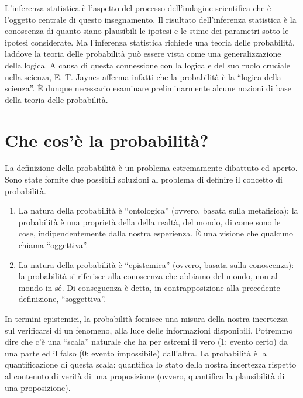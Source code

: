 \documentclass[
  11pt,
]{krantz}
\theoremstyle{definition}
\theoremstyle{definition}
\theoremstyle{definition}
\theoremstyle{definition}
\theoremstyle{remark}
\begin{document}
L'inferenza statistica è l'aspetto del processo dell'indagine scientifica che è l'oggetto centrale di questo insegnamento. Il risultato dell'inferenza statistica è la conoscenza di quanto siano plausibili le ipotesi e le stime dei parametri sotto le ipotesi considerate. Ma l'inferenza statistica richiede una teoria delle probabilità, laddove la teoria delle probabilità può essere vista come una generalizzazione della logica. A causa di questa connessione con la logica e del suo ruolo cruciale nella scienza, E. T. Jaynes afferma infatti che la probabilità è la ``logica della scienza''. È dunque necessario esaminare preliminarmente alcune nozioni di base della teoria delle probabilità.

\hypertarget{che-cosuxe8-la-probabilituxe0}{%
\section{Che cos'è la probabilità?}\label{che-cosuxe8-la-probabilituxe0}}

La definizione della probabilità è un problema estremamente dibattuto ed aperto. Sono state fornite due possibili soluzioni al problema di definire il concetto di probabilità.

\begin{enumerate}
\def\labelenumi{(\alph{enumi})}
\item
  La natura della probabilità è ``ontologica'' (ovvero, basata sulla metafisica): la probabilità è una proprietà della della realtà, del mondo, di come sono le cose, indipendentemente dalla nostra esperienza. È una visione che qualcuno chiama ``oggettiva''.
\item
  La natura della probabilità è ``epistemica'' (ovvero, basata sulla conoscenza): la probabilità si riferisce alla conoscenza che abbiamo del mondo, non al mondo in sé. Di conseguenza è detta, in contrapposizione alla precedente definizione, ``soggettiva''.
\end{enumerate}

In termini epistemici, la probabilità fornisce una misura della nostra incertezza sul verificarsi di un fenomeno, alla luce delle informazioni disponibili. Potremmo dire che c'è una ``scala'' naturale che ha per estremi il vero (1: evento certo) da una parte ed il falso (0: evento impossibile) dall'altra. La probabilità è la quantificazione di questa scala: quantifica lo stato della nostra incertezza rispetto al contenuto di verità di una proposizione (ovvero, quantifica la plausibilità di una proposizione).
\end{document}
